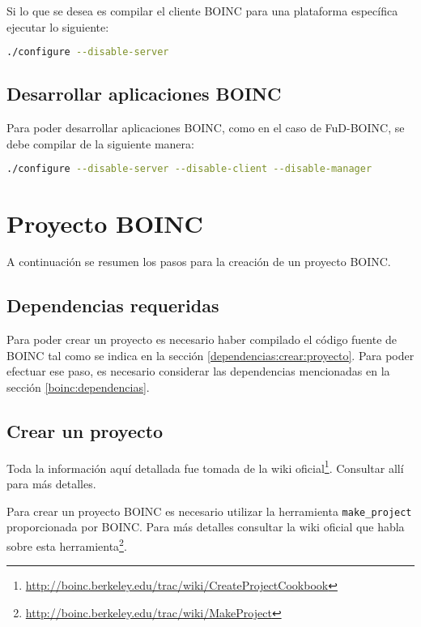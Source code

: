 \documentclass[12pt,spanish,a4paper]{report}
\begin{document}
Si lo que se desea es compilar el cliente BOINC para una plataforma específica ejecutar lo siguiente:

\begin{lstlisting}[frame=shadowbox, language=bash, basicstyle=\footnotesize, backgroundcolor=\color{gris}]
./configure --disable-server
\end{lstlisting}

\subsection{Desarrollar aplicaciones BOINC}

Para poder desarrollar aplicaciones BOINC, como en el caso de FuD-BOINC, se debe compilar de la siguiente manera:

\begin{lstlisting}[frame=shadowbox, language=bash, basicstyle=\footnotesize, backgroundcolor=\color{gris}]
./configure --disable-server --disable-client --disable-manager
\end{lstlisting}


\section{Proyecto BOINC}


A continuación se resumen los pasos para la creación de un proyecto BOINC.


\subsection{Dependencias requeridas}

Para poder crear un proyecto es necesario haber compilado el código fuente de BOINC tal como se indica en la sección \ref{dependencias:crear:proyecto}. Para poder efectuar ese paso, es necesario considerar las dependencias mencionadas en la sección \ref{boinc:dependencias}.
			
\subsection{Crear un proyecto}

Toda la información aquí detallada fue tomada de la wiki oficial\footnote{\url{http://boinc.berkeley.edu/trac/wiki/CreateProjectCookbook}}. Consultar allí para más detalles.

Para crear un proyecto BOINC es necesario utilizar la herramienta \texttt{make\_project} proporcionada por BOINC. Para más detalles consultar la wiki oficial que habla sobre esta herramienta\footnote{\url{http://boinc.berkeley.edu/trac/wiki/MakeProject}}.
\end{document}
